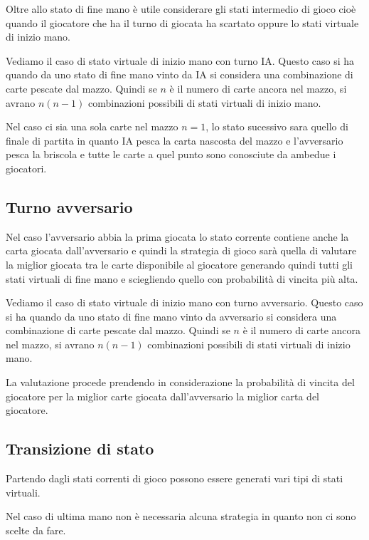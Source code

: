 \documentclass[a4paper,11pt]{article}
\begin{document}
Oltre allo stato di fine mano è utile considerare gli stati intermedio di gioco cioè quando
il giocatore che ha il turno di giocata
ha scartato oppure lo stati virtuale di inizio mano.

Vediamo il caso di stato virtuale di inizio mano  con turno IA.
Questo caso si ha quando da uno stato di fine mano vinto da IA si considera una combinazione
di carte pescate dal mazzo.
Quindi se $ n $ è il numero di carte ancora nel mazzo, si avrano $ n (n - 1) $ combinazioni
possibili di stati virtuali di inizio mano.

Nel caso ci sia una sola carte nel mazzo $ n = 1 $, lo stato sucessivo sara quello di finale
 di partita in quanto IA pesca la carta nascosta del mazzo e l'avversario pesca
la briscola e tutte le carte a quel punto sono conosciute da ambedue i giocatori.


\subsection{Turno avversario}

Nel caso l'avversario abbia la prima giocata lo stato corrente contiene anche la carta giocata
dall'avversario e quindi la strategia di gioco sarà quella di valutare la miglior giocata tra le carte
disponibile al giocatore generando quindi tutti gli stati virtuali di fine mano e sciegliendo quello
con probabilità di vincita più alta.

Vediamo il caso di stato virtuale di inizio mano  con turno avversario.
Questo caso si ha quando da uno stato di fine mano vinto da avversario si considera
una combinazione di carte pescate dal mazzo.
Quindi se $ n $ è il numero di carte ancora nel mazzo, si avrano $ n (n - 1) $ combinazioni
possibili di stati virtuali di inizio mano.

La valutazione procede prendendo in considerazione la probabilità di vincita del giocatore per
la miglior carte giocata dall'avversario la miglior carta del giocatore.

\subsection{Transizione di stato}

Partendo dagli stati correnti di gioco possono essere generati vari tipi di stati virtuali.


Nel caso di ultima mano  non è necessaria alcuna strategia in quanto
 non ci sono scelte da fare.
\end{document}
